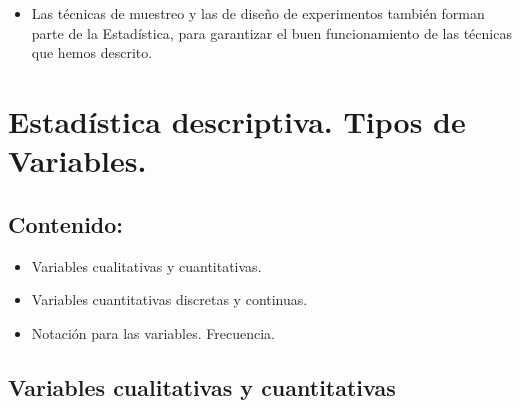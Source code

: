 \begin{itemize}
    \item Las técnicas de {\sf muestreo} y las de {\sf diseño de experimentos} también forman parte de la Estadística, para garantizar el buen funcionamiento de las técnicas que hemos descrito.


\end{itemize}

\section{Estadística descriptiva. Tipos de Variables.}

\subsection*{Contenido:}
\begin{itemize}
 \item Variables cualitativas y cuantitativas.
 \item Variables cuantitativas discretas y continuas.
 \item Notación para las variables. Frecuencia.
\end{itemize}


\subsection{Variables cualitativas y cuantitativas}

